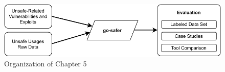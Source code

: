 \begin{figure}[htp!]
    \includegraphics[width=\textwidth]{assets/figures/chapter5/outline5.pdf}
    \caption{Organization of Chapter 5}
    \label{fig:outline5}
\end{figure}
